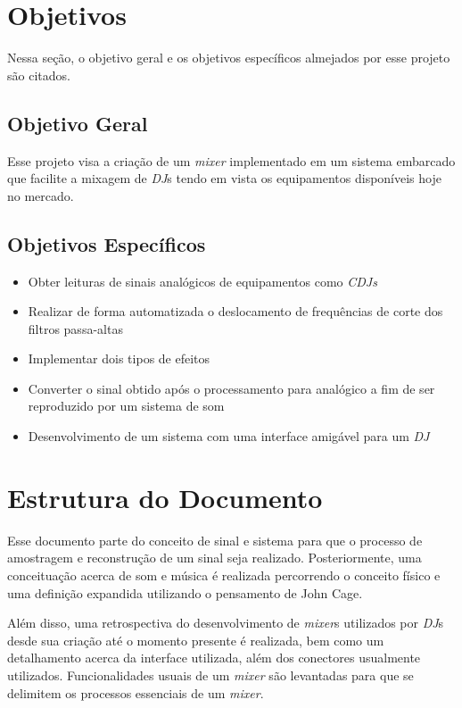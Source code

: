 \section{Objetivos}

Nessa seção, o objetivo geral e os objetivos específicos almejados por esse projeto são citados.

\subsection{Objetivo Geral}
Esse projeto visa a criação de um \textit{mixer} implementado em um sistema embarcado que facilite a mixagem de \textit{DJ}s tendo em vista os equipamentos disponíveis hoje no mercado.

\subsection{Objetivos Específicos}
\begin{itemize}
    \item Obter leituras de sinais analógicos de equipamentos como \textit{CDJs}
    \item Realizar de forma automatizada o deslocamento de frequências de corte dos filtros passa-altas
    \item Implementar dois tipos de efeitos
    \item Converter o sinal obtido após o processamento para analógico a fim de ser reproduzido por um sistema de som
    \item Desenvolvimento de um sistema com uma interface amigável para um \textit{DJ}
\end{itemize}

\section{Estrutura do Documento}

Esse documento parte do conceito de sinal e sistema para que o processo de amostragem e reconstrução de um sinal seja realizado. Posteriormente, uma conceituação acerca de som e música é realizada percorrendo o conceito físico e uma definição expandida utilizando o pensamento de John Cage.

Além disso, uma retrospectiva do desenvolvimento de \textit{mixer}s utilizados por \textit{DJ}s desde sua criação até o momento presente é realizada, bem como um detalhamento acerca da interface utilizada, além dos conectores usualmente utilizados. Funcionalidades usuais de um \textit{mixer} são levantadas para que se delimitem os processos essenciais de um \textit{mixer}.

